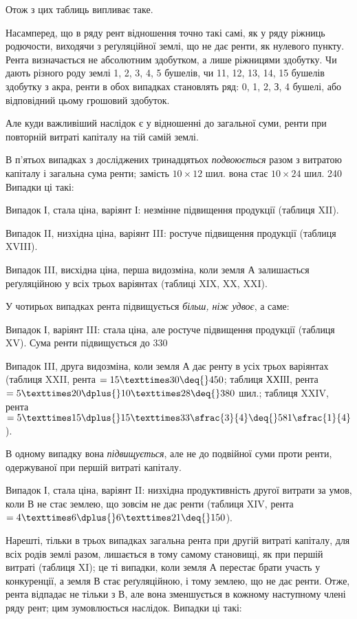 
Отож з цих таблиць випливає таке.

Насамперед, що в ряду рент відношення точно такі самі, як у ряду ріжниць
родючости, виходячи з реґуляційної землі, що не дає ренти, як нулевого
пункту. Рента визначається не абсолютним здобутком, а лише ріжницями здобутку.
Чи дають різного роду землі 1, 2, 3, 4, 5 бушелів, чи 11, 12, 13, 14,
15 бушелів здобутку з акра, ренти в обох випадках становлять ряд: 0, 1, 2,
З, 4 бушелі, або відповідний цьому грошовий здобуток.

Але куди важливіший наслідок є у відношенні до загальної суми, ренти
при повторній витраті капіталу на тій самій землі.

В п’ятьох випадках з досліджених тринадцятьох \emph{подвоюється} разом з витратою
капіталу і загальна сума ренти; замість $10 × 12$ шил. вона стає
$10 × 24$ шил. \deq{} 240 Випадки ці такі:

Випадок І, стала ціна, варіянт І: незмінне підвищення продукції (таблиця
XII).

Випадок II, низхідна ціна, варіянт III: ростуче підвищення продукції
(таблиця XVIII).

Випадок III, висхідна ціна, перша видозміна, коли земля $А$ залишається
реґуляційною у всіх трьох варіянтах (таблиці XIX, XX, XXI).

У чотирьох випадках рента підвищується \emph{більш, ніж удвоє}, а саме:

Випадок І, варіянт III: стала ціна, але ростуче підвищення продукції
(таблиця XV). Сума ренти підвищується до 330

Випадок III, друга видозміна, коли земля $А$ дає ренту в усіх трьох варіянтах
(таблиця XXII, рента $= 15 × 30 \deq{} 450$; таблиця ХХІІІ, рента $= 5 ×
20 \dplus{} 10 × 28 \deq{} 380$ шил.; таблиця XXIV, рента
$= 5 × 15 \dplus{} 15 × 33\sfrac{3}{4} \deq{} 581\sfrac{1}{4}$).

В одному випадку вона \emph{підвищується}, але не до подвійної суми проти
ренти, одержуваної при першій витраті капіталу.

Випадок І, стала ціна, варіянт II: низхідна продуктивність другої витрати
за умов, коли $В$ не стає землею, що зовсім не дає ренти (таблиця XIV, рента
$= 4 × 6 \dplus{} 6 × 21 \deq{} 150$).

Нарешті, тільки в трьох випадках загальна рента при другій витраті
капіталу, для всіх родів землі разом, лишається в тому самому становищі, як при
першій витраті (таблиця XI); це ті випадки, коли земля $А$ перестає брати участь
у конкуренції, а земля $В$ стає реґуляційною, і тому землею, що не дає ренти.
Отже, рента відпадає не тільки з $В$, але вона зменшується в кожному наступному
члені ряду рент; цим зумовлюється наслідок. Випадки ці такі:

